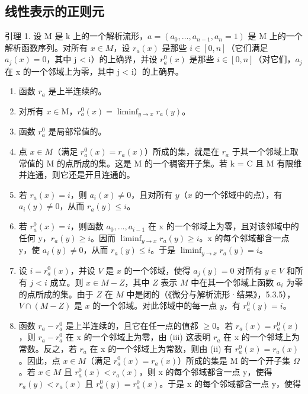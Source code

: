 \subsection{线性表示的正则元}

引理 1. 设 M 是 k 上的一个解析流形，\(a = (a_{0}, \ldots, a_{n-1}, a_{n} = 1)\) 是 M 上的一个解析函数序列。对所有 \(x \in M\)，设 \(r_{a}(x)\) 是那些 \(i \in [0, n]\)（它们满足 \(a_{j}(x) = 0\)，其中 j \textless{} i）的上确界，并设 \(r_{a}^{0}(x)\) 是那些 \(i \in [0, n]\)（对它们，\(a_{j}\) 在 x 的一个邻域上为零，其中 j \textless{} i）的上确界。

\begin{enumerate}
\def\labelenumi{(\roman{enumi})}
\item
  函数 \(r_a\) 是上半连续的。
\item
  对所有 \(x \in \mathrm{M}\)，\(r_a^0(x) = \liminf_{y \to x} r_a(y)\)。
\item
  函数 \(r_a^0\) 是局部常值的。
\item
  点 \(x \in M\)（满足 \(r_{a}^{0}(x) = r_{a}(x)\)）所成的集，就是在 \(r_{a}\) 于其一个邻域上取常值的 M 的点所成的集。这是 M 的一个稠密开子集。若 k = C 且 M 有限维并连通，则它还是开且连通的。
\item
  若 \(r_a(x) = i\)，则 \(a_i(x) \neq 0\)，且对所有 \(y\)（\(x\) 的一个邻域中的点），有 \(a_i(y) \neq 0\)，从而 \(r_a(y) \leq i\)。
\item
  若 \(r_{a}^{0}(x) = i\)，则函数 \(a_{0}, \ldots, a_{i-1}\) 在 x 的一个邻域上为零，且对该邻域中的任何 y，\(r_{a}(y) \geq i\)。因而 \(\liminf_{y \to x} r_{a}(y) \geq i\)。x 的每个邻域都含一点 y，使 \(a_{i}(y) \neq 0\)，从而 \(r_{a}(y) \leq i\)。于是 \(\liminf_{y \to x} r_{a}(y) = i\)。
\item
  设 \(i = r_a^0 (x)\)，并设 \(V\) 是 \(x\) 的一个邻域，使得 \(a_{j}(y) = 0\) 对所有 \(y\in V\) 和所有 \(j < i\) 成立。则 \(x\in M - Z\)，其中 \(Z\) 表示 \(M\) 中在其一个邻域上函数 \(a_{i}\) 为零的点所成的集。由于 \(Z\) 在 \(M\) 中是闭的（《微分与解析流形·结果》，5.3.5），\(V\cap (M - Z)\) 是 \(x\) 的一个邻域。对此邻域中的每一点 \(y\)，有 \(r_a^0 (y) = i\)。
\item
  函数 \(r_{a}-r_{a}^{0}\) 是上半连续的，且它在任一点的值都 \(\geq0\)。若 \(r_{a}(x)=r_{a}^{0}(x)\)，则 \(r_{a}-r_{a}^{0}\) 在 x 的一个邻域上为零，由 (iii) 这表明 \(r_{a}\) 在 x 的一个邻域上为常数。反之，若 \(r_{a}\) 在 x 的一个邻域上为常数，则由 (ii) 有 \(r_{a}^{0}(x)=r_{a}(x)\)。因此，点 \(x\in M\)（满足 \(r_{a}^{0}(x)=r_{a}(x)\)）所成的集是 M 的一个开子集 \(\Omega\)。若 \(x\in M\) 且 \(r_{a}^{0}(x)<r_{a}(x)\)，则 x 的每个邻域都含一点 y，使得 \(r_{a}(y)<r_{a}(x)\) 且 \(r_{a}^{0}(y)=r_{a}^{0}(x)\)。于是 x 的每个邻域都含一点 y，使得
\end{enumerate}

